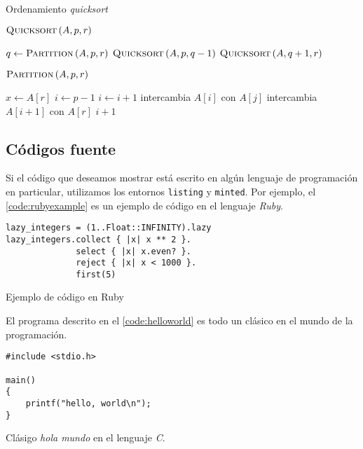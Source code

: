 \begin{algorithm}
	\caption{Ordenamiento \emph{quicksort}}
    \label{alg:quicksort}

	\vspace{10 pt}
	$\textsc{Quicksort}\left(A,p,r\right)$

    \begin{algorithmic}[1]
        	\STATE $q \leftarrow \textsc{Partition} \left( A, p, r \right)$
            \STATE $\textsc{Quicksort}\left( A, p, q-1 \right)$
            \STATE $\textsc{Quicksort}\left( A, q+1, r \right)$
        \ENDIF
	\end{algorithmic}
    
    \vspace{10 pt}
    $\textsc{Partition}\left(A,p,r\right)$
    \begin{algorithmic}[1]
    	\STATE $x \leftarrow A\left[r\right]$
        \STATE $i \leftarrow p-1$
            	\STATE $i \leftarrow i+1$
                \STATE intercambia $A\left[i\right]$ con $A\left[j\right]$
            \ENDIF
        \ENDFOR
        \STATE intercambia $A\left[i+1\right]$ con $A\left[r\right]$
        \RETURN $i + 1$
    \end{algorithmic}
\end{algorithm}

\subsection{Códigos fuente}

Si el código que deseamos mostrar está escrito en algún lenguaje de programación en particular, 
utilizamos los entornos \texttt{listing} y \texttt{minted}. Por ejemplo, el 
\cref{code:rubyexample} es un ejemplo de código en el lenguaje \emph{Ruby}.\\

\begin{listing}[H]
\begin{verbatim}
lazy_integers = (1..Float::INFINITY).lazy
lazy_integers.collect { |x| x ** 2 }.
              select { |x| x.even? }.
              reject { |x| x < 1000 }.
              first(5)
\end{verbatim}
\caption{Ejemplo de código en Ruby}
\label{code:rubyexample}
\end{listing}

El programa descrito en el \cref{code:helloworld} es todo un clásico en el mundo de la 
programación.\\

\begin{listing}[H]
\begin{verbatim}
#include <stdio.h>

main()
{
    printf("hello, world\n");
}
\end{verbatim}
\caption{Clásigo \emph{hola mundo} en el lenguaje \emph{C}.}
\label{code:helloworld}
\end{listing}
